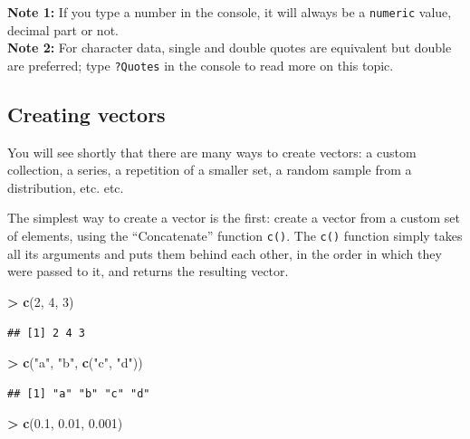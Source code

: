 \documentclass[]{book}
\newenvironment{Shaded}{\begin{snugshade}}{\end{snugshade}}
\newcommand{\DecValTok}[1]{\textcolor[rgb]{0.00,0.00,0.81}{#1}}
\newcommand{\FloatTok}[1]{\textcolor[rgb]{0.00,0.00,0.81}{#1}}
\newcommand{\KeywordTok}[1]{\textcolor[rgb]{0.13,0.29,0.53}{\textbf{#1}}}
\newcommand{\NormalTok}[1]{#1}
\newcommand{\OperatorTok}[1]{\textcolor[rgb]{0.81,0.36,0.00}{\textbf{#1}}}
\newcommand{\StringTok}[1]{\textcolor[rgb]{0.31,0.60,0.02}{#1}}
\begin{document}
\textbf{Note 1:} If you type a number in the console, it will always be a \texttt{numeric} value, decimal part or not.\\
\textbf{Note 2:} For character data, single and double quotes are equivalent but double are preferred; type \texttt{?Quotes} in the console to read more on this topic.

\hypertarget{creating-vectors}{%
\subsection{Creating vectors}\label{creating-vectors}}

You will see shortly that there are many ways to create vectors: a custom collection, a series, a repetition of a smaller set, a random sample from a distribution, etc. etc.

The simplest way to create a vector is the first: create a vector from a custom set of elements, using the ``Concatenate'' function \texttt{c()}. The \texttt{c()} function simply takes all its arguments and puts them behind each other, in the order in which they were passed to it, and returns the resulting vector.

\begin{Shaded}
\begin{Highlighting}[]
\OperatorTok{>}\StringTok{ }\KeywordTok{c}\NormalTok{(}\DecValTok{2}\NormalTok{, }\DecValTok{4}\NormalTok{, }\DecValTok{3}\NormalTok{)}
\end{Highlighting}
\end{Shaded}

\begin{verbatim}
## [1] 2 4 3
\end{verbatim}

\begin{Shaded}
\begin{Highlighting}[]
\OperatorTok{>}\StringTok{ }\KeywordTok{c}\NormalTok{(}\StringTok{"a"}\NormalTok{, }\StringTok{"b"}\NormalTok{, }\KeywordTok{c}\NormalTok{(}\StringTok{"c"}\NormalTok{, }\StringTok{"d"}\NormalTok{))}
\end{Highlighting}
\end{Shaded}

\begin{verbatim}
## [1] "a" "b" "c" "d"
\end{verbatim}

\begin{Shaded}
\begin{Highlighting}[]
\OperatorTok{>}\StringTok{ }\KeywordTok{c}\NormalTok{(}\FloatTok{0.1}\NormalTok{, }\FloatTok{0.01}\NormalTok{, }\FloatTok{0.001}\NormalTok{)}
\end{Highlighting}
\end{Shaded}
\end{document}
